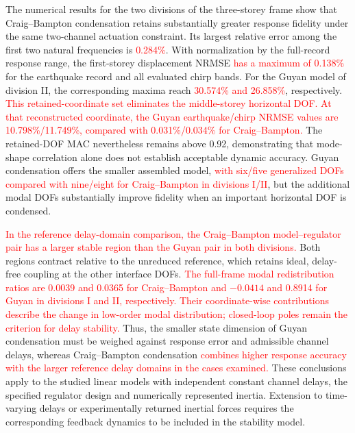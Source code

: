 \documentclass[a4paper,fleqn,review,12pt]{cas-sc}
\numberwithin{equation}{section}
\newcommand{\rev}[1]{\textcolor{red}{#1}}
\begin{document}
The numerical results for the two divisions of the three-storey frame show that Craig--Bampton condensation retains substantially greater response fidelity under the same two-channel actuation constraint. Its largest relative error among the first two natural frequencies is \rev{0.284\%}. With normalization by the full-record response range, the first-storey displacement NRMSE \rev{has a maximum of 0.138\%} for the earthquake record and all evaluated chirp bands. For the Guyan model of division II, the corresponding maxima reach \rev{30.574\% and 26.858\%}, respectively. \rev{This retained-coordinate set eliminates the middle-storey horizontal DOF. At that reconstructed coordinate, the Guyan earthquake/chirp NRMSE values are 10.798\%/11.749\%, compared with 0.031\%/0.034\% for Craig--Bampton.} The retained-DOF MAC nevertheless remains above 0.92, demonstrating that mode-shape correlation alone does not establish acceptable dynamic accuracy. Guyan condensation offers the smaller assembled model, \rev{with six/five generalized DOFs compared with nine/eight for Craig--Bampton in divisions I/II}, but the additional modal DOFs substantially improve fidelity when an important horizontal DOF is condensed.

\rev{In the reference delay-domain comparison, the Craig--Bampton model--regulator pair has a larger stable region than the Guyan pair in both divisions.} Both regions contract relative to the unreduced reference, which retains ideal, delay-free coupling at the other interface DOFs. \rev{The full-frame modal redistribution ratios are 0.0039 and 0.0365 for Craig--Bampton and \(-0.0414\) and 0.8914 for Guyan in divisions I and II, respectively. Their coordinate-wise contributions describe the change in low-order modal distribution; closed-loop poles remain the criterion for delay stability.} Thus, the smaller state dimension of Guyan condensation must be weighed against response error and admissible channel delays, whereas Craig--Bampton condensation \rev{combines higher response accuracy with the larger reference delay domains in the cases examined.} These conclusions apply to the studied linear models with independent constant channel delays, the specified regulator design and numerically represented inertia. Extension to time-varying delays or experimentally returned inertial forces requires the corresponding feedback dynamics to be included in the stability model.


\FloatBarrier


\end{document}
